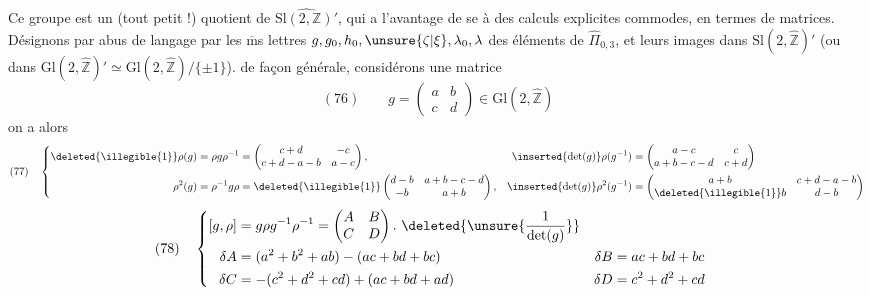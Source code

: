 Ce groupe est un (tout petit !) quotient de $\widehat{\mathrm{Sl}(2,\mathbb Z)'}$, qui a l'avantage de se  à des calculs  explicites commodes, en termes de matrices. Désignons par abus de langage par les $\overline{\mathrm m}$s lettres $g,g_0,h_0,\unsure{\zeta|\xi},\lambda_0,\lambda$ des éléments de  $\widehat{\Pi}_{0,3}$,  et leurs images dans  $\mathrm{Sl}(2,\widehat{\mathbb Z})'$  (ou dans $\mathrm{Gl}(2,\widehat{\mathbb Z})'\simeq\mathrm{Gl}(2,\widehat{\mathbb Z})/\{\pm1\}$).   de façon générale, considérons une matrice
\[
(76)\qquad g=\begin{pmatrix}a&b\\c&d\end{pmatrix}\in\mathrm{Gl}(2,\widehat{\mathbb Z})
\]
on a alors
\[
(77)\quad
\left\{\begin{aligned}
\deleted{\illegible{1}}\rho(g)&=\rho g\rho^{-1}=\begin{pmatrix}c+d&-c\\c+d-a-b&a-c\end{pmatrix},
&\inserted{\det(g)}\rho(g^{-1})&=\begin{pmatrix}a-c&c\\a+b-c-d&c+d\end{pmatrix}\\
\rho^2(g)&=\rho^{-1}g\rho=\deleted{\illegible{1}}\begin{pmatrix}d-b&a+b-c-d\\-b&a+b\end{pmatrix},
&\inserted{\det(g)}\rho^2(g^{-1})&=\begin{pmatrix}a+b&c+d-a-b\\\deleted{\illegible{1}}b&d-b\end{pmatrix}
\end{aligned}\right.
\]
\[
(78)\quad
\left\{\begin{aligned}
\relax[g,\rho]&=g\rho g^{-1}\rho^{-1}=\begin{pmatrix}A&B\\C&D\end{pmatrix}.\ \deleted{\unsure{\frac{1}{\det(g)}}}\\
\delta A&=(a^2+b^2+ab)-(ac+bd+bc)&\delta B&=ac+bd+bc\\
\delta C&=-(c^2+d^2+cd)+(ac+bd+ad)&\delta D&=c^2+d^2+cd
\end{aligned}\right.
\]

